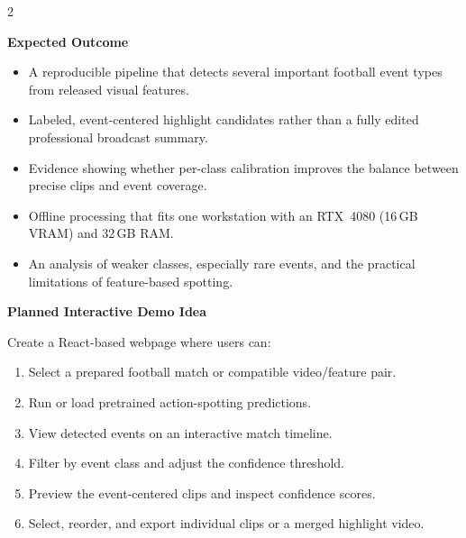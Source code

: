 \documentclass[10pt,a4paper]{article}
\newcommand{\sectiontitle}[1]{%
  \vspace{4pt}\par{\fontsize{15}{17}\selectfont\bfseries #1}\par\vspace{3pt}%
}
\begin{document}
\begin{multicols}{2}
\sectiontitle{Expected Outcome}

\begin{itemize}
  \item A reproducible pipeline that detects several important football event types from released visual features.
  \item Labeled, event-centered highlight candidates rather than a fully edited professional broadcast summary.
  \item Evidence showing whether per-class calibration improves the balance between precise clips and event coverage.
  \item Offline processing that fits one workstation with an RTX~4080 (16\,GB VRAM) and 32\,GB RAM.
  \item An analysis of weaker classes, especially rare events, and the practical limitations of feature-based spotting.
\end{itemize}

\sectiontitle{Planned Interactive Demo Idea}

Create a React-based webpage where users can:
\begin{enumerate}
  \item Select a prepared football match or compatible video/feature pair.
  \item Run or load pretrained action-spotting predictions.
  \item View detected events on an interactive match timeline.
  \item Filter by event class and adjust the confidence threshold.
  \item Preview the event-centered clips and inspect confidence scores.
  \item Select, reorder, and export individual clips or a merged highlight video.
\end{enumerate}

\end{multicols}
\end{document}
